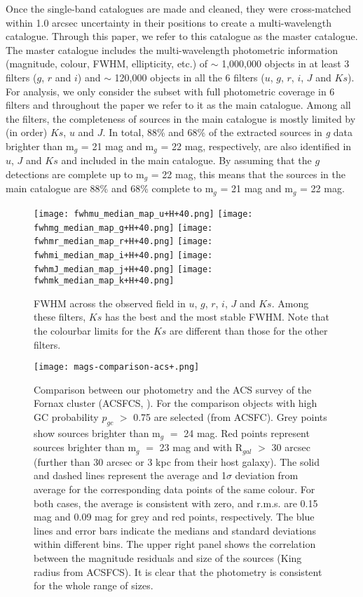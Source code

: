 \documentclass[fleqn,usenatbib]{mnras}
\begin{document}
Once the single-band catalogues are made and cleaned, they were cross-matched within 1.0 arcsec uncertainty in their positions to create a multi-wavelength catalogue. Through this paper, we refer to this catalogue as the master catalogue. The master catalogue includes the multi-wavelength photometric information (magnitude, colour, FWHM, ellipticity, etc.) of $\sim$ 1,000,000 objects in at least 3 filters ($g$, $r$ and $i$) and $\sim$ 120,000 objects in all the 6 filters ($u$, $g$, $r$, $i$, $J$ and $Ks$). For analysis, we only consider the subset with full photometric coverage in 6 filters and throughout the paper we refer to it as the main catalogue. Among all the filters, the completeness of sources in the main catalogue is mostly limited by (in order) $Ks$, $u$ and $J$. In total, 88\% and 68\% of the extracted sources in \textit{g} data brighter than m$_{g}$ = 21 mag and m$_{g}$ = 22 mag, respectively, are also identified in $u$, $J$ and $Ks$ and included in the main catalogue. By assuming that the $g$ detections are complete up to m$_{g}$ = 22 mag, this means that the sources in the main catalogue are 88\% and 68\% complete to m$_{g}$ = 21 mag and m$_{g}$ = 22 mag.

\begin{figure*}
\centering
        \texttt{[image: fwhmu\_median\_map\_u+H+40.png]}
        \texttt{[image: fwhmg\_median\_map\_g+H+40.png]}
        \texttt{[image: fwhmr\_median\_map\_r+H+40.png]}
        \texttt{[image: fwhmi\_median\_map\_i+H+40.png]}
        \texttt{[image: fwhmJ\_median\_map\_j+H+40.png]}
        \texttt{[image: fwhmk\_median\_map\_k+H+40.png]}
    \caption{FWHM across the observed field in $u$, $g$, $r$, $i$, $J$ and $Ks$. Among these filters, $Ks$ has the best and the most stable FWHM. Note that the colourbar limits for the $Ks$ are different than those for the other filters.}
\label{fwhmmaps}
\end{figure*}


\begin{figure*}
\centering
        \texttt{[image: mags-comparison-acs+.png]}
\caption{Comparison between our photometry and the ACS survey of the Fornax cluster (ACSFCS, \citealp{jordan2015}). For the comparison objects with high GC probability $p_{gc}$ $>$ 0.75 are selected (from ACSFC). Grey points show sources brighter than m$_g$ $=$ 24 mag. Red points represent sources brighter than m$_g$ $=$ 23 mag and with R$_{gal}$ $>$ 30 arcsec (further than 30 arcsec or 3 kpc from their host galaxy). The solid and dashed lines represent the average and 1$\sigma$ deviation from average for the corresponding data points of the same colour. For both cases, the average is consistent with zero, and r.m.s. are 0.15 mag and 0.09 mag for grey and red points, respectively. The blue lines and error bars indicate the medians and standard deviations within different bins. The upper right panel shows the correlation between the magnitude residuals and size of the sources (King radius from ACSFCS). It is clear that the photometry is consistent for the whole range of sizes.}
\label{fdsvsacs}
\end{figure*}
\end{document}
